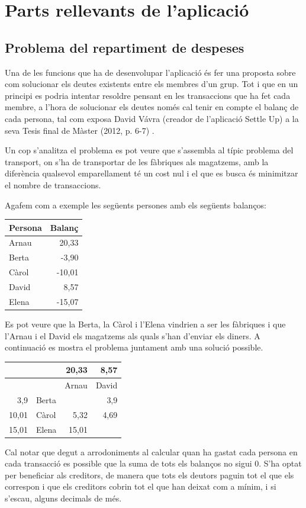 \chapter{Parts rellevants de l'aplicació}

\section{Problema del repartiment de despeses}
Una de les funcions que ha de desenvolupar l'aplicació és fer una proposta sobre com solucionar els deutes existents entre els membres d'un grup. Tot i que en un principi es podria intentar resoldre pensant en les transaccions que ha fet cada membre, a l'hora de solucionar els deutes només cal tenir en compte el balanç de cada persona, tal com exposa David Vávra (creador de l'aplicació Settle Up) a la seva Tesis final de Màster (2012, p. 6-7) \cite{Settle_up}.

Un cop s'analitza el problema es pot veure que s'assembla al típic problema del transport, on s'ha de transportar de les fàbriques als magatzems, amb la diferència qualsevol emparellament té un cost nul i el que es busca és minimitzar el nombre de transaccions. 

Agafem com a exemple les següents persones amb els següents balanços:
\begin{tabular}{ | l | r |}
\hline
Persona & Balanç \\
\hline
Arnau & 20,33 \\
\hline
Berta & -3,90 \\
\hline
Càrol & -10,01 \\
\hline
David & 8,57 \\
\hline
Elena & -15,07 \\
\hline
\end{tabular}

Es pot veure que la Berta, la Càrol i l'Elena vindrien a ser les fàbriques i que l'Arnau i el David els magatzems als quals s'han d'enviar els diners. A continuació es mostra el problema juntament amb una solució possible.

\begin{tabular}{ | r | l | r | r |}
 \hline
 & & 20,33 & 8,57 \\
 \hline
 & & Arnau & David \\
 \hline
 3,9 & Berta & & 3,9\\
 \hline
 10,01 & Càrol & 5,32 & 4,69\\
 \hline
 15,01 & Elena & 15,01 & \\
 \hline
\end{tabular}
Cal notar que degut a arrodoniments al calcular quan ha gastat cada persona en cada transacció es possible que la suma de tots els balanços no sigui 0. S'ha optat per beneficiar als creditors, de manera que tots els deutors paguin tot el que els correspon i que els creditors cobrin tot el que han deixat com a mínim, i si s'escau, alguns decimals de més.

